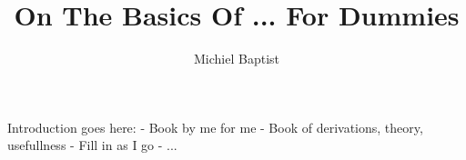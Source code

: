 \documentclass{book}
\author{Michiel Baptist}
\title{On The Basics Of ... For Dummies}
\newcommand{\base}{chapters}
\theoremstyle{plain}
\theoremstyle{definition}
\begin{document}
	\maketitle
	Introduction goes here:
		- Book by me for me
		- Book of derivations, theory, usefullness
		- Fill in as I go
		- ...
	\tableofcontents
	
	
	
	
\end{document}
